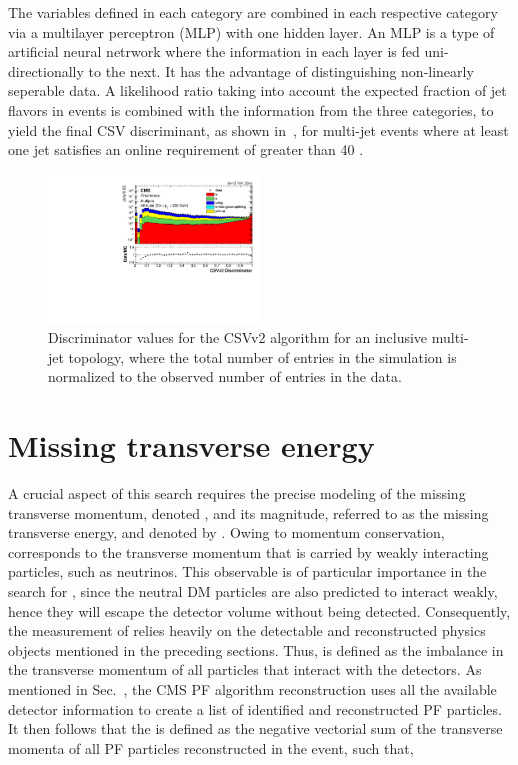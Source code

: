 The variables defined in each category are combined in each respective category via a multilayer perceptron (MLP) with one hidden layer. An MLP is a type of artificial neural netrwork where the information in each layer is fed uni-directionally to the next. It has the advantage of distinguishing non-linearly seperable data. A likelihood ratio taking into account the expected fraction of jet flavors in \ttbar events is combined with the information from the three categories, to yield the final CSV discriminant, as shown in~, for multi-jet events where at least one jet satisfies an online \pt requirement of greater than 40 \GeV.

\begin{figure}
\centering
\includegraphics[width=0.5\textwidth]{figs/csvv2_multijet_13TeV.pdf}
\caption{Discriminator values for the CSVv2 algorithm for an inclusive multi-jet topology, where the total number of entries in the simulation is normalized to the observed number of entries in the data.}
\label{fig:CSVv2_multijet}
\end{figure}

\section{Missing transverse energy}
\label{sec:MET}
A crucial aspect of this search requires the precise modeling of the missing transverse momentum, denoted \ptvecmiss, and its magnitude, referred to as the missing transverse energy, and denoted by \ptmiss. Owing to momentum conservation, \ptvecmiss corresponds to the transverse momentum that is carried by weakly interacting particles, such as neutrinos. This observable is of particular importance in the search for \ttDM, since the neutral DM particles are also predicted to interact weakly, hence they will escape the detector volume without being detected. Consequently, the measurement of \ptmiss relies heavily on the detectable and reconstructed physics objects mentioned in the preceding sections. Thus, \ptmiss is defined as the imbalance in the transverse momentum of all particles that interact with the detectors. As mentioned in Sec.~{}, the CMS PF algorithm reconstruction uses all the available detector information to create a list of identified and reconstructed PF particles. It then follows that the \ptvecmiss is defined as the negative vectorial sum of the transverse momenta of all PF particles reconstructed in the event, such that,

